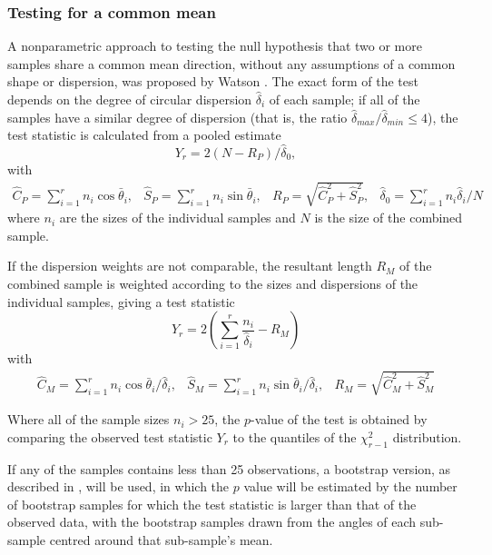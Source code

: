 \documentclass[../../ArchStats.tex]{subfiles}
\begin{document}

\subsubsection{Testing for a common mean}
\label{sec:common-mean-test}

A nonparametric approach to testing the null hypothesis that two or more samples share a common mean direction, without any assumptions of a common shape or dispersion, was proposed by Watson .  The exact form of the test depends on the degree of circular dispersion $\hat{\delta}_i$ of each sample; if all of the samples have a similar degree of dispersion (that is, the ratio $\hat{\delta}_{max} / \hat{\delta}_{min} \leq 4$), the test statistic is calculated from a pooled estimate
\[Y_r = 2(N - R_P) / \hat{\delta}_0,\]
with
\[\begin{matrix*}
\hat{C}_P = \sum_{i=1}^r n_i \cos \bar{\theta}_i, &
\hat{S}_P = \sum_{i=1}^r n_i \sin \bar{\theta}_i, &
R_P = \sqrt{\hat{C}_P^2 + \hat{S}_P^2}, &
\hat{\delta}_0 = \sum_{i=1}^r n_i \hat{\delta}_i / N
\end{matrix*}\]
where $n_i$ are the sizes of the individual samples and $N$ is the size of the combined sample.

If the dispersion weights are not comparable, the resultant length $R_M$ of the combined sample is weighted according to the sizes and dispersions of the individual samples, giving a test statistic
\[Y_r = 2\left(\sum_{i=1}^r \frac{n_i}{\hat{\delta}_i} - R_M\right)\]
with 
\[\begin{matrix*}
\hat{C}_M = \sum_{i=1}^r n_i \cos \bar{\theta}_i / \hat{\delta}_i, &
\hat{S}_M = \sum_{i=1}^r n_i \sin \bar{\theta}_i / \hat{\delta}_i, &
R_M = \sqrt{\hat{C}_M^2 + \hat{S}_M^2}
\end{matrix*}\]

Where all of the sample sizes $n_i > 25$, the $p$-value of the test is obtained by comparing the observed test statistic $Y_r$ to the quantiles of the $\chi^2_{r-1}$ distribution. 

If any of the samples contains less than 25 observations, a bootstrap version, as described in \cite[section 8.4.4]{Fisher1993}, will be used, in which the $p$ value will be estimated by the number of bootstrap samples for which the test statistic is larger than that of the observed data, with the bootstrap samples drawn from the angles of each sub-sample centred around that sub-sample's mean. 
\end{document}

